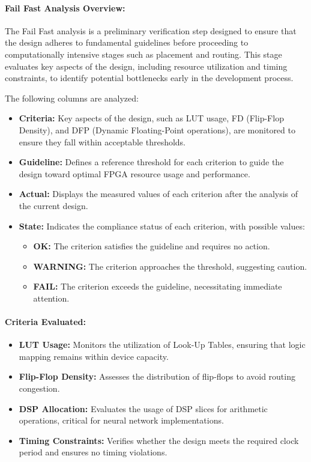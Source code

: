 \documentclass{article}
\begin{document}
\paragraph{Fail Fast Analysis Overview:}

The Fail Fast analysis is a preliminary verification step designed to ensure that the design adheres to fundamental guidelines before proceeding to computationally intensive stages such as placement and routing. This stage evaluates key aspects of the design, including resource utilization and timing constraints, to identify potential bottlenecks early in the development process.

The following columns are analyzed:

\begin{itemize}
    \item \textbf{Criteria:} Key aspects of the design, such as LUT usage, FD (Flip-Flop Density), and DFP (Dynamic Floating-Point operations), are monitored to ensure they fall within acceptable thresholds.
    \item \textbf{Guideline:} Defines a reference threshold for each criterion to guide the design toward optimal FPGA resource usage and performance.
    \item \textbf{Actual:} Displays the measured values of each criterion after the analysis of the current design.
    \item \textbf{State:} Indicates the compliance status of each criterion, with possible values:
    \begin{itemize}
        \item \textbf{OK:} The criterion satisfies the guideline and requires no action.
        \item \textbf{WARNING:} The criterion approaches the threshold, suggesting caution.
        \item \textbf{FAIL:} The criterion exceeds the guideline, necessitating immediate attention.
    \end{itemize}
\end{itemize}

\paragraph{Criteria Evaluated:}
\begin{itemize}
    \item \textbf{LUT Usage:} Monitors the utilization of Look-Up Tables, ensuring that logic mapping remains within device capacity.
    \item \textbf{Flip-Flop Density:} Assesses the distribution of flip-flops to avoid routing congestion.
    \item \textbf{DSP Allocation:} Evaluates the usage of DSP slices for arithmetic operations, critical for neural network implementations.
    \item \textbf{Timing Constraints:} Verifies whether the design meets the required clock period and ensures no timing violations.
\end{itemize}
\end{document}
